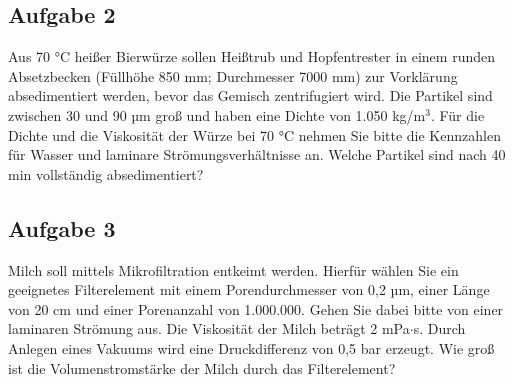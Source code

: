 \documentclass[a4paper,11pt]{article}
\newif\ifshowme
\begin{document}
\subsection*{Aufgabe 2}
Aus 70 °C heißer Bierwürze sollen Heißtrub und Hopfentrester in einem runden Absetzbecken
(Füllhöhe 850 mm; Durchmesser 7000 mm) zur Vorklärung absedimentiert werden, bevor das
Gemisch zentrifugiert wird. Die Partikel sind zwischen 30 und 90 µm groß und haben eine
Dichte von 1.050 kg/m$^3$. Für die Dichte und die Viskosität der Würze bei 70 °C nehmen Sie bitte die Kennzahlen für Wasser und laminare Strömungsverhältnisse an.
\pp
Welche Partikel sind nach 40 min vollständig absedimentiert?


\ifshowme
\antwort{

Geschwindigkeit die Partikel brauchen um nach 40min vollständig absedimentiert zu sein:
\begin{align*}
v &= 0,85~\text{m} / ~2400~\text{s} \\
&= 3,5 \cdot 10^{-4} ~\text{m/s}
\end{align*}
Stokes umstellen:
\begin{align*}
v &= \frac{d^2 \cdot g \cdot (\rho_1 - \rho_2)}{18 \cdot \eta} \\
d &= \sqrt{\frac{v \cdot 18 \cdot \eta}{g \cdot \Delta p}} \\
d &= \sqrt{\frac{3,5 \cdot 10^{-4} ~\text{m/s} \cdot 18 \cdot 1 \cdot 10^{-3} ~\text{Pa s}}{9,81 ~\text{m/s} \cdot 50 ~\text{kg/m}^3}} \\
 &= 7,2 \cdot 10^{-5} ~\text{m} \\
 &= 72 ~\text{µm}
\end{align*}
Alle Fettkügelchen die größer als 72µm sind, sedimentieren vollständig.
}
\else
\fi


\pagebreak
\subsection*{Aufgabe 3}
Milch soll mittels Mikrofiltration entkeimt werden. Hierfür wählen Sie ein geeignetes
Filterelement mit einem Porendurchmesser von 0,2 µm, einer Länge von 20 cm und einer
Porenanzahl von 1.000.000. Gehen Sie dabei bitte von einer laminaren Strömung aus. Die
Viskosität der Milch beträgt 2 mPa$\cdot$s. Durch Anlegen eines Vakuums wird eine Druckdifferenz
von 0,5 bar erzeugt. Wie groß ist die Volumenstromstärke der Milch durch das Filterelement? 

\ifshowme
\antwort{
\begin{align*}
\dot{V} &= \frac{\pi \cdot \Delta p \cdot R^4}{8 \cdot l \cdot \eta} \\
\dot{V} &= \frac{\pi \cdot 5 \cdot 10^4 ~\text{Pa} \cdot (1 \cdot 10^{-7} ~\text{m})^4}{8 \cdot 0,2 ~\text{m} \cdot 2 \cdot 10^{-3} ~\text{Pa s}} \\
&= 4,91 \cdot 10^{-21} ~\text{m}^3/\text{s}
\end{align*}
Dadurch, dass wir aber eine Anzahl von 1.000.000 Poren haben, müssen wir den Volumenstrom $\dot{V}$ nochmal mit der Anzahl multiplizieren:
\begin{align*}
4,91 \cdot 10^{-21} ~\text{m}^3/\text{s} \cdot 1.000.000 = 4,91 \cdot 10^{-15}
\end{align*}

}
\else
\fi
\end{document}
